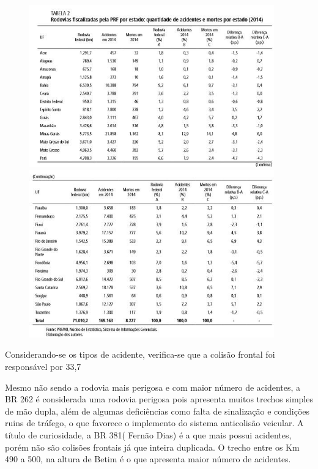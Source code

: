 \begin{enumerate}
\begin{figure}[h]
  \centering
  \includegraphics[width=400px, scale=0.5]{figuras/table1}
  \includegraphics[width=400px, scale=0.5]{figuras/table2}
  \label{table:table}
\end{figure}

Considerando-se os tipos de acidente, verifica-se que a colisão frontal foi responsável por 33,7%

Mesmo não sendo a rodovia mais perigosa e com maior número de acidentes, a BR 262 é considerada uma rodovia perigosa pois apresenta muitos trechos simples de mão dupla, além de algumas deficiências como falta de sinalização e condições ruins de tráfego, o que favorece o implemento do sistema anticolisão veicular. A título de curiosidade, a BR 381( Fernão Dias) é a que mais possui acidentes, porém não são colisões frontais já que inteira duplicada. O trecho entre os Km 490 a 500, na altura de Betim é o que apresenta maior número de acidentes.


\end{enumerate}
